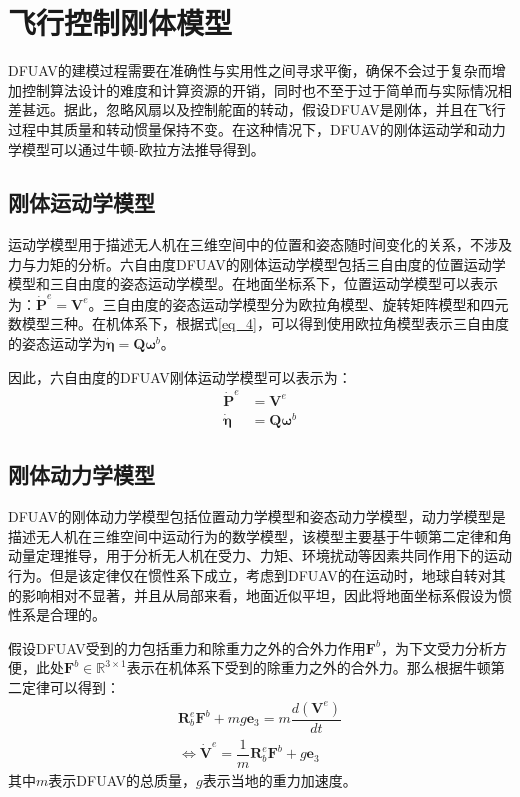 \section{飞行控制刚体模型}

DFUAV的建模过程需要在准确性与实用性之间寻求平衡，确保不会过于复杂而增加控制算法设计的难度和计算资源的开销，同时也不至于过于简单而与实际情况相差甚远。据此，忽略风扇以及控制舵面的转动，假设DFUAV是刚体，并且在飞行过程中其质量和转动惯量保持不变。在这种情况下，DFUAV的刚体运动学和动力学模型可以通过牛顿-欧拉方法推导得到。

\subsection{刚体运动学模型}

运动学模型用于描述无人机在三维空间中的位置和姿态随时间变化的关系，不涉及力与力矩的分析。六自由度DFUAV的刚体运动学模型包括三自由度的位置运动学模型和三自由度的姿态运动学模型。在地面坐标系下，位置运动学模型可以表示为：$\boldsymbol{\dot{P}}^{e} = \boldsymbol{V}^{e}$。三自由度的姿态运动学模型分为欧拉角模型、旋转矩阵模型和四元数模型三种。在机体系下，根据式\eqref{eq_4}，可以得到使用欧拉角模型表示三自由度的姿态运动学为$\dot{\boldsymbol{\eta}}=\boldsymbol{Q}\boldsymbol{\omega}^b$。

因此，六自由度的DFUAV刚体运动学模型可以表示为：
\begin{equation}
    \begin{aligned}
    \boldsymbol{\dot{P}}^{e} &= \boldsymbol{V}^{e} \\
    \dot{\boldsymbol{\eta}}&=\boldsymbol{Q}\boldsymbol{\omega}^b
    \end{aligned}
    \label{eq_6}
\end{equation}

\subsection{刚体动力学模型}

DFUAV的刚体动力学模型包括位置动力学模型和姿态动力学模型，动力学模型是描述无人机在三维空间中运动行为的数学模型，该模型主要基于牛顿第二定律和角动量定理推导，用于分析无人机在受力、力矩、环境扰动等因素共同作用下的运动行为。但是该定律仅在惯性系下成立，考虑到DFUAV的在运动时，地球自转对其的影响相对不显著，并且从局部来看，地面近似平坦，因此将地面坐标系假设为惯性系是合理的。

假设DFUAV受到的力包括重力和除重力之外的合外力作用$\boldsymbol{F}^b$，为下文受力分析方便，此处$\boldsymbol{F}^b\in\mathbb{R}^{3\times1}$表示在机体系下受到的除重力之外的合外力。那么根据牛顿第二定律可以得到：
\begin{equation}
    \begin{gathered}
    \boldsymbol{R}_b^e\boldsymbol{F}^b + mg\boldsymbol{e}_3 = m\dfrac{d({\boldsymbol{V}}^e)}{dt}
    \\
    \Leftrightarrow\dot{\boldsymbol{V}}^e=\dfrac{1}{m}\boldsymbol{R}_b^e\boldsymbol{F}^b + g\boldsymbol{e}_3 
    \label{eq_7}
    \end{gathered}
\end{equation}
其中$m$表示DFUAV的总质量，$g$表示当地的重力加速度。

